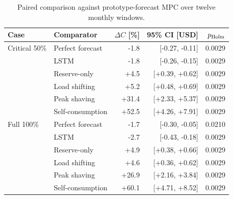 \begin{table}[t]
\centering
\small
\caption{Paired comparison against prototype-forecast MPC over twelve monthly windows.}
\label{tab:controller-comparison}
\begin{tabular}{llrrr}
\toprule
Case & Comparator & $\Delta C$ [\%] & 95\% CI [USD] & $p_{\rm Holm}$ \\
\midrule
Critical 50\% & Perfect forecast & -1.8 & [-0.27, -0.11] & 0.0029 \\
 & LSTM & -1.8 & [-0.26, -0.15] & 0.0029 \\
 & Reserve-only & +4.5 & [+0.39, +0.62] & 0.0029 \\
 & Load shifting & +5.2 & [+0.48, +0.69] & 0.0029 \\
 & Peak shaving & +31.4 & [+2.33, +5.37] & 0.0029 \\
 & Self-consumption & +52.5 & [+4.26, +7.91] & 0.0029 \\
Full 100\% & Perfect forecast & -1.7 & [-0.30, -0.05] & 0.0210 \\
 & LSTM & -2.7 & [-0.43, -0.18] & 0.0029 \\
 & Reserve-only & +4.9 & [+0.38, +0.66] & 0.0029 \\
 & Load shifting & +4.6 & [+0.36, +0.62] & 0.0029 \\
 & Peak shaving & +26.9 & [+2.16, +3.84] & 0.0029 \\
 & Self-consumption & +60.1 & [+4.71, +8.52] & 0.0029 \\
\bottomrule
\end{tabular}
\par{}
\end{table}
